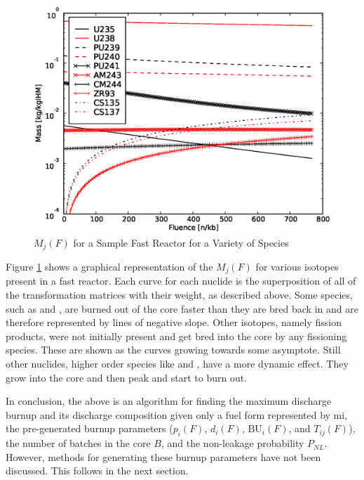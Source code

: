 \begin{figure}[htbp]
\caption{$M_j(F)$ for a Sample Fast Reactor for a Variety of Species}
\label{1g_fig07}
\begin{center}
\includegraphics[scale=0.5]{one_group_method/figs/Fig07.eps}
\end{center}
\end{figure}

Figure \ref{1g_fig07} shows a graphical representation of the $M_j(F)$ for various isotopes present 
in a fast reactor.  Each curve for each nuclide is the superposition of all of the transformation 
matrices with their weight, as described above.  Some species, such as  and , 
are burned out of the core faster than they are bred back in and are therefore represented by lines of 
negative slope.  Other isotopes, namely fission products, were not initially present and get bred into 
the core by any fissioning species.  These are shown as the curves growing towards some asymptote.  
Still other nuclides, higher order species like  and , have a more dynamic effect.  
They grow into the core and then peak and start to burn out.  

In conclusion, the above is an algorithm for finding the maximum discharge burnup and its discharge 
composition given only a fuel form represented by mi, the pre-generated burnup parameters ($p_i(F)$, 
$d_i(F)$, $\mbox{BU}_i(F)$, and $T_{ij}(F)$), the number of batches in the core $B$, and the non-leakage 
probability $P_{NL}$.  However, methods for generating these burnup parameters have not been discussed.  
This follows in the next section. 



